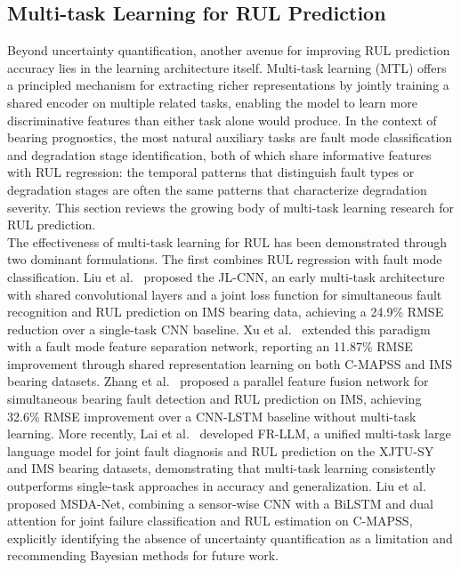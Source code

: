 \documentclass[review]{elsarticle}
\begin{document}
\subsection{Multi-task Learning for RUL Prediction}
\label{sec:multitask_rul}

Beyond uncertainty quantification, another avenue for improving
RUL prediction accuracy lies in the learning architecture itself.
Multi-task learning (MTL) offers a principled mechanism for
extracting richer representations by jointly training a shared
encoder on multiple related tasks, enabling the model to learn
more discriminative features than either task alone would produce.
In the context of bearing prognostics, the most natural auxiliary
tasks are fault mode classification and degradation stage
identification, both of which share informative features with RUL
regression: the temporal patterns that distinguish fault types or
degradation stages are often the same patterns that characterize
degradation severity. This section reviews the growing body of
multi-task learning research for RUL prediction.\\

The effectiveness of multi-task learning for RUL has been
demonstrated through two dominant formulations. The first combines
RUL regression with fault mode classification.
Liu et al.~\cite{8709822} proposed the JL-CNN, an early
multi-task architecture with shared convolutional layers and a joint
loss function for simultaneous fault recognition and RUL prediction
on IMS bearing data, achieving a 24.9\% RMSE reduction over a
single-task CNN baseline.
Xu et al.~\cite{xu_novel_2025} extended this paradigm with a fault
mode feature separation network, reporting an 11.87\% RMSE
improvement through shared representation learning on both C-MAPSS
and IMS bearing datasets.
Zhang et al.~\cite{10216122} proposed a parallel feature fusion
network for simultaneous bearing fault detection and RUL prediction
on IMS, achieving 32.6\% RMSE improvement over a CNN-LSTM baseline
without multi-task learning.
More recently, Lai et al.~\cite{LAI2026112091} developed FR-LLM, a
unified multi-task large language model for joint fault diagnosis
and RUL prediction on the XJTU-SY and IMS bearing datasets,
demonstrating that multi-task learning consistently outperforms
single-task approaches in accuracy and generalization.
Liu et al.~\cite{11434241} proposed MSDA-Net, combining a
sensor-wise CNN with a BiLSTM and dual attention for joint failure
classification and RUL estimation on C-MAPSS, explicitly
identifying the absence of uncertainty quantification as a
limitation and recommending Bayesian methods for future work.\\
\end{document}
